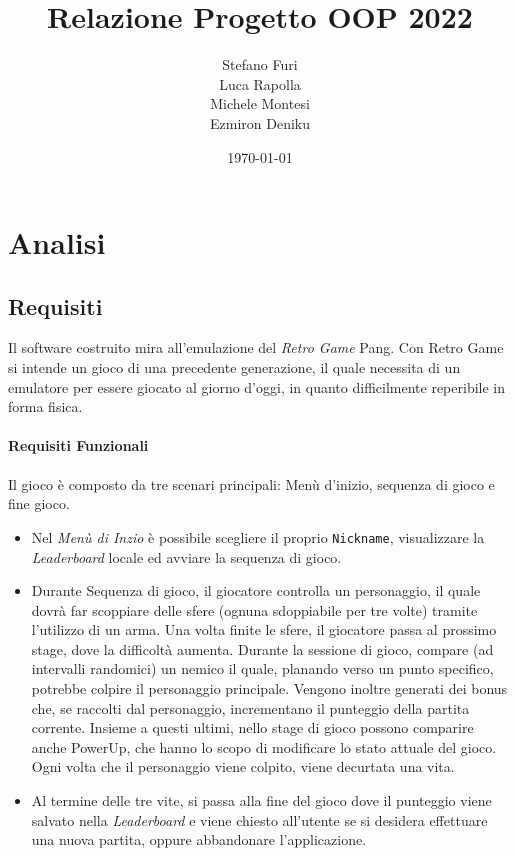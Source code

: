 \documentclass[a4paper,12pt]{report}
\title{Relazione Progetto OOP 2022}
\author{
    Stefano Furi\\
    Luca Rapolla\\
    Michele Montesi\\
    Ezmiron Deniku\\
}
\date{\today}
\begin{document}
\maketitle

\tableofcontents

\chapter{Analisi}
\section{Requisiti}
Il software costruito mira all'emulazione del \emph{Retro Game} Pang. Con Retro Game si intende un gioco di una precedente generazione, il quale necessita di un emulatore per essere giocato al giorno d'oggi, in quanto difficilmente reperibile in forma fisica. 
\subsubsection{Requisiti Funzionali}
Il gioco è composto da tre scenari principali: Menù d'inizio, sequenza di gioco e fine gioco.
\begin{itemize}
    \item Nel \emph{Menù di Inzio} è possibile scegliere il proprio \texttt{Nickname}, visualizzare la \emph{Leaderboard} locale ed avviare la sequenza di gioco.
    \item Durante Sequenza di gioco, il giocatore controlla un personaggio, il quale dovrà far scoppiare delle sfere (ognuna sdoppiabile per tre volte) tramite l'utilizzo di un arma. Una volta finite le sfere, il giocatore passa al prossimo stage, dove la difficoltà aumenta. Durante la sessione di gioco, compare (ad intervalli randomici) un nemico il quale, planando verso un punto specifico, potrebbe colpire il personaggio principale. Vengono inoltre generati dei bonus che, se raccolti dal personaggio, incrementano il punteggio della partita corrente. Insieme a questi ultimi, nello stage di gioco possono comparire anche PowerUp, che hanno lo scopo di modificare lo stato attuale del gioco. Ogni volta che il personaggio viene colpito, viene decurtata una vita.
    \item Al termine delle tre vite, si passa alla fine del gioco dove il punteggio viene salvato nella \emph{Leaderboard} e viene chiesto all'utente se si desidera effettuare una nuova partita, oppure abbandonare l'applicazione.
\end{itemize}
\end{document}
